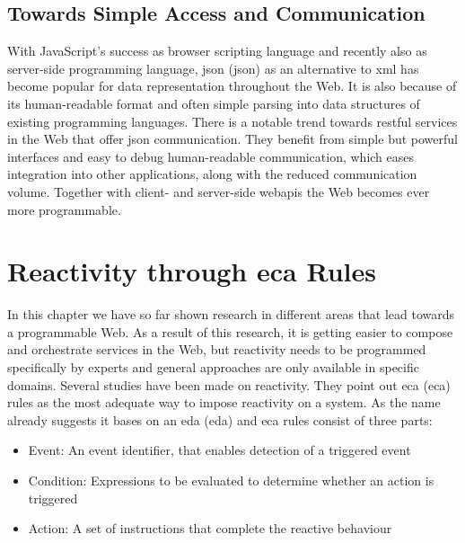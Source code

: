 \subsection{Towards Simple Access and Communication}
With JavaScript's success as browser scripting language and recently also as server-side programming language, \textrm{\acrlong{json} (\acrshort{json})} as an alternative to \textrm{\acrshort{xml}} has become popular for data representation throughout the Web.
It is also because of its human-readable format and often simple parsing into data structures of existing programming languages.
There is a notable trend towards \textrm{\acrshort{rest}ful} services in the Web that offer \textrm{\acrshort{json}} communication.
They benefit from simple but powerful interfaces and easy to debug human-readable communication, which eases integration into other applications, along with the reduced communication volume.
Together with client- and server-side \textrm{\gls{webapi}s} the Web becomes ever more programmable.



\section{Reactivity through \acrlong{eca} Rules}
In this chapter we have so far shown research in different areas that lead towards a programmable Web.
As a result of this research, it is getting easier to compose and orchestrate services in the Web, but reactivity needs to be programmed specifically by experts and general approaches are only available in specific domains.
Several studies\cite{2007_AlferesR3}\cite{2005-Bry_etal-XChange.pdf}\cite{10.1007-11896548_63}\cite{papamarkos2004rdftl}\cite{2012-Paschke_etal-ReactionRuleML.pdf} have been made on reactivity.
They point out \textrm{\acrlong{eca} (\acrshort{eca})} rules as the most adequate way to impose reactivity on a system.
As the name already suggests it bases on an \textrm{\acrlong{eda} (\acrshort{eda})} and \textrm{\acrshort{eca}} rules consist of three parts:
\begin{itemize}
  \item Event: An event identifier, that enables detection of a triggered event
  \item Condition: Expressions to be evaluated to determine whether an action is triggered
  \item Action: A set of instructions that complete the reactive behaviour
\end{itemize}

